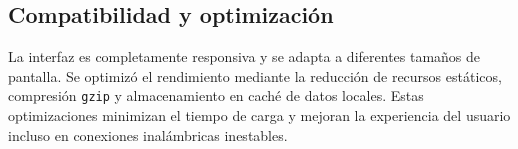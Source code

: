 \subsection{Compatibilidad y optimización}
La interfaz es completamente responsiva y se adapta a diferentes tamaños de pantalla. Se optimizó el rendimiento mediante la reducción de recursos estáticos, compresión \texttt{gzip} y almacenamiento en caché de datos locales.  
Estas optimizaciones minimizan el tiempo de carga y mejoran la experiencia del usuario incluso en conexiones inalámbricas inestables.


